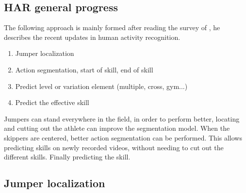 \subsection{HAR general progress}

The following approach is mainly formed after reading the survey of \textcite{Pareek_2020}, he describes the recent updates in human activity recognition.

\begin{enumerate}
    \item Jumper localization
    \item Action segmentation, start of skill, end of skill
    \item Predict level or variation element (multiple, cross, gym...)
    \item Predict the effective skill
\end{enumerate}

Jumpers can stand everywhere in the field, in order to perform better, locating and cutting out the athlete can improve the segmentation model. When the skippers are centered, better action segmentation can be performed. This allows predicting skills on newly recorded videos, without needing to cut out the different skills. Finally predicting the skill.

\subsection{Jumper localization}
\label{subsec:jumper localization}


